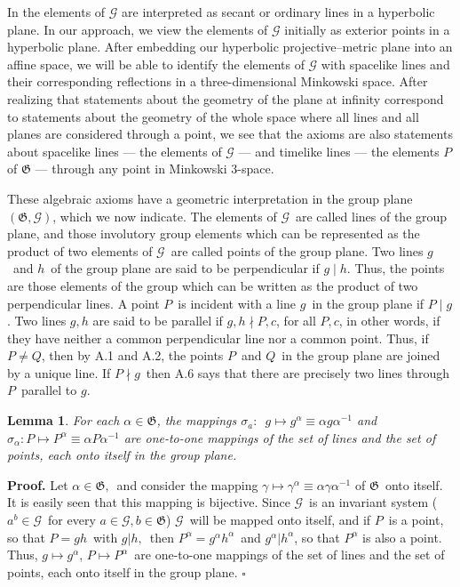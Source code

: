 \documentclass[a4paper,twoside,12pt]{article}
\newtheorem{lemma}{Lemma}[section]
\newenvironment{proof}{\medskip \noindent 
            {\bf Proof.}}{ \hfill $\square$ \medskip}
\begin{document}
     In \cite{BBPW} the elements of $\mathcal{G}$ are interpreted as
secant or ordinary lines in a hyperbolic plane. In our approach, we
view the elements of $\mathcal{G}$ initially as exterior points in a
hyperbolic plane. After embedding our hyperbolic projective--metric
plane into an affine space, we will be able to identify the elements
of $\mathcal{G}$ with spacelike lines and their corresponding
reflections in a three-dimensional Minkowski space. After realizing
that statements about the geometry of the plane at infinity correspond
to statements about the geometry of the whole space where all lines
and all planes are considered through a point, we see that the axioms
are also statements about spacelike lines --- the elements of
$\mathcal{G}$ --- and timelike lines --- the elements $P$ of
$\mathfrak{G}$ --- through any point in Minkowski 3-space.

     These algebraic axioms have a geometric interpretation in the 
group plane $(\mathfrak{G},\mathcal{G})$, which we now indicate.
The elements of $\mathcal{G}$\ are called lines of the group plane, and
those involutory group elements which can be represented as the product of
two elements of $\mathcal{G}$\ are called points of the group plane. Two
lines $g$\ and $h$\ of the group plane are said to be perpendicular if 
$g \mid h$. Thus, the points are those elements of the group which can 
be written as the product of two perpendicular lines. A point $P$\ is 
incident with a line $g$\ in the group plane if $P \mid g$. Two lines 
$g,h$ are said to be parallel if $g,h \nmid P,c$, for all $P,c$,
in other words, if they have neither a common perpendicular line nor a 
common point. Thus, if $P \neq Q$, then by A.1 and A.2, the
points $P$\ and $Q$\ in the group plane are joined by a unique line. If $%
P\nmid g$\ then A.6 says that there are precisely two lines through $P$\
parallel to $g.$

\begin{lemma} For each $\alpha \in \mathfrak{G}$, the mappings 
$\sigma_{a}:$\ $g\longmapsto g^{\alpha }\equiv \alpha g\alpha^{-1}$ and 
$\sigma_{\alpha }:P\longmapsto P^{\alpha }\equiv \alpha P\alpha^{-1}$ 
are one-to-one mappings of the set of lines and the set of points, each 
onto itself in the group plane.
\end{lemma}

\begin{proof} Let $\alpha \in \mathfrak{G},$\ and consider the mapping 
$\gamma \longmapsto \gamma ^{\alpha }\equiv \alpha \gamma \alpha^{-1}$ of 
$\mathfrak{G}$\ onto itself. It is easily seen that this mapping is
bijective. Since $\mathcal{G}$\ is an invariant system ($a^{b}\in \mathcal{G}
$\ for every $a\in \mathcal{G}, b \in \mathfrak{G}$) $\mathcal{G}$\ will 
be mapped onto
itself, and if $P$\ is a point, so that $P=gh$\ with $g|h,$\ then 
$P^{\alpha}=g^{\alpha }h^{\alpha }$\ and $g^{\alpha }|h^{\alpha }$, so that 
$P^{\alpha }$ is also a point. Thus, $g\longmapsto g^{\alpha }$, 
$P\longmapsto P^{\alpha }$\ are one-to-one mappings of the set of lines and
the set of points, each onto itself in the group plane.
\end{proof}
\end{document}
